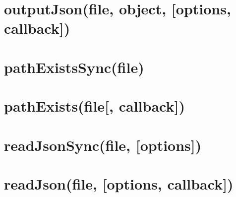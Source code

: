 \documentclass[twoside]{book}
\newcommand{\+}{\discretionary{\mbox{\scriptsize$\hookleftarrow$}}{}{}}
\begin{document}
\chapter{output\+Json(file, object, \mbox{[}options, callback\mbox{]})}
\label{md_dsmacc_vis_degree_node_modules_electron-packager_node_modules_electron-download_node_modules_fs-extra_docs_outputJson}

\chapter{path\+Exists\+Sync(file)}
\label{md_dsmacc_vis_degree_node_modules_electron-packager_node_modules_electron-download_node_modules_fs-extra_docs_pathExists-sync}

\chapter{path\+Exists(file\mbox{[}, callback\mbox{]})}
\label{md_dsmacc_vis_degree_node_modules_electron-packager_node_modules_electron-download_node_modules_fs-extra_docs_pathExists}

\chapter{read\+Json\+Sync(file, \mbox{[}options\mbox{]})}
\label{md_dsmacc_vis_degree_node_modules_electron-packager_node_modules_electron-download_node_modules_fs-extra_docs_readJson-sync}

\chapter{read\+Json(file, \mbox{[}options, callback\mbox{]})}
\label{md_dsmacc_vis_degree_node_modules_electron-packager_node_modules_electron-download_node_modules_fs-extra_docs_readJson}

\end{document}
